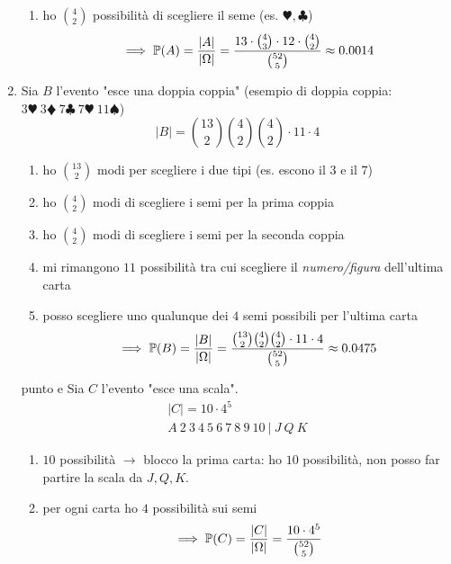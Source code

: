 \begin{enumerate}
\begin{enumerate}
		\item ho $\binom{4}{2}$ possibilità di scegliere il seme (es. $\varheartsuit ,\clubsuit $)
		\begin{equation*}
			\implies \mathbb{P}(A) =\frac{| A| }{| \Omega | } =\frac{13\cdot \binom{4}{3} \cdot 12\cdot \binom{4}{2}}{\binom{52}{5}} \approx 0.0014
		\end{equation*}
	\end{enumerate}
	\item Sia $B$ l'evento "esce una doppia coppia" (esempio di doppia coppia: $3\varheartsuit \ 3\vardiamondsuit \ 7\clubsuit \ 7\varheartsuit \ 11\spadesuit $)
	\begin{equation*}
		| B| =\binom{13}{2}\binom{4}{2}\binom{4}{2} \cdot 11\cdot 4
	\end{equation*}
	\begin{enumerate}
		\item ho $\binom{13}{2}$ modi per scegliere i due tipi (es. escono il $3$ e il $7$)
		\item ho $\binom{4}{2}$ modi di scegliere i semi per la prima coppia
		\item ho $\binom{4}{2}$ modi di scegliere i semi per la seconda coppia
		\item mi rimangono $11$ possibilità tra cui scegliere il \textit{numero/figura} dell'ultima carta
		\item posso scegliere uno qualunque dei $4$ semi possibili per l'ultima carta
		\begin{equation*}
			\implies \mathbb{P}(B) =\frac{| B| }{| \Omega | } =\frac{\binom{13}{2}\binom{4}{2}\binom{4}{2} \cdot 11\cdot 4}{\binom{52}{5}} \approx 0.0475
		\end{equation*}
	\end{enumerate}
	\item [punto e] Sia $C$ l'evento "esce una scala".
	\begin{gather*}
		| C| =10\cdot 4^{5}\\
		A\ 2\ 3\ 4\ 5\ 6\ 7\ 8\ 9\ 10\ |\ J\ Q\ K
	\end{gather*}
	\begin{enumerate}
		\item $10$ possibilità $\rightarrow $ blocco la prima carta: ho $10$ possibilità, non posso far partire la scala da $J,Q,K$.
		\item per ogni carta ho $4$ possibilità sui semi
		\begin{equation*}
			\implies \mathbb{P}(C) =\frac{| C| }{| \Omega | } =\frac{10\cdot 4^{5}}{\binom{52}{5}}
		\end{equation*}

\end{enumerate}
\end{enumerate}
